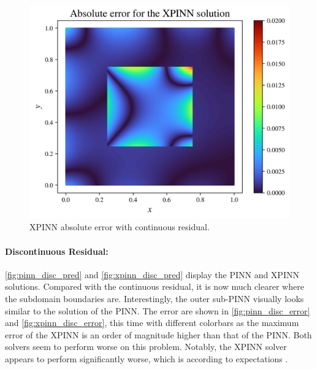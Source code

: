 \begin{figure}[h]
    \centering
    \includegraphics[width=\linewidth]{Project1XPINNs/figures/Poisson/smooth_xpinn_Poisson_error.png}
    \caption{XPINN absolute error with continuous residual.}
    \label{fig:xpinn_smooth_error}
\end{figure}


\paragraph{Discontinuous Residual:}
\autoref{fig:pinn_disc_pred} and \autoref{fig:xpinn_disc_pred} display the PINN and XPINN solutions.
Compared with the continuous residual, it is now much clearer where the subdomain boundaries are.
Interestingly, the outer sub-PINN visually looks similar to the solution of the PINN.
The error are shown in \autoref{fig:pinn_disc_error} and \autoref{fig:xpinn_disc_error}, this time with different colorbars as the maximum error of the XPINN is an order of magnitude higher than that of the PINN.
Both solvers seem to perform worse on this problem. Notably, the XPINN solver appears to perform significantly worse, which is according to expectations \cite{XPINN_generalize}.

